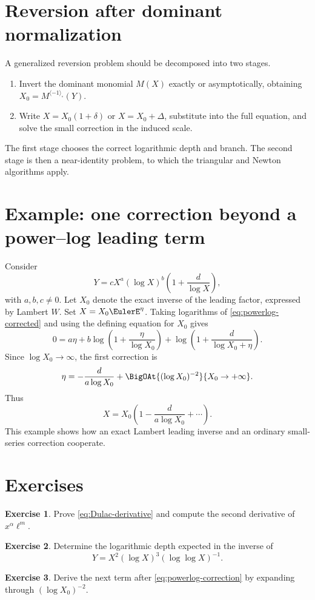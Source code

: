 \documentclass[11pt,openany]{book}
\theoremstyle{definition}
\newtheorem{exercise}{Exercise}[chapter]
\theoremstyle{plain}
\theoremstyle{remark}
\newcommand{\invcomp}{^{\langle -1\rangle_{\circ}}}
\begin{document}
\section{Reversion after dominant normalization}
A generalized reversion problem should be decomposed into two stages.
\begin{enumerate}
\item Invert the dominant monomial \(M(X)\) exactly or asymptotically, obtaining \(X_0=M\invcomp(Y)\).
\item Write \(X=X_0(1+\delta)\) or \(X=X_0+\Delta\), substitute into the full equation, and solve the small correction in the induced scale.
\end{enumerate}
The first stage chooses the correct logarithmic depth and branch. The second stage is then a near-identity problem, to which the triangular and Newton algorithms apply.

\section{Example: one correction beyond a power--log leading term}
Consider
\begin{equation}\label{eq:powerlog-corrected}
 Y=cX^a(\log X)^b\left(1+\frac{d}{\log X}\right),
\end{equation}
with \(a,b,c\ne0\). Let \(X_0\) denote the exact inverse of the leading factor, expressed by Lambert \(W\). Set \(X=X_0\EulerE^\eta\). Taking logarithms of \cref{eq:powerlog-corrected} and using the defining equation for \(X_0\) gives
\[
 0=a\eta+b\log\left(1+\frac{\eta}{\log X_0}\right)
 +\log\left(1+\frac{d}{\log X_0+\eta}\right).
\]
Since \(\log X_0\to\infty\), the first correction is
\begin{equation}\label{eq:powerlog-correction}
 \eta=-\frac{d}{a\log X_0}
 +\BigOAt{(\log X_0)^{-2}}{X_0\to+\infty}.
\end{equation}
Thus
\[
 X=X_0\left(1-\frac{d}{a\log X_0}+\cdots\right).
\]
This example shows how an exact Lambert leading inverse and an ordinary small-series correction cooperate.

\section{Exercises}
\begin{exercise}
Prove \cref{eq:Dulac-derivative} and compute the second derivative of \(x^\alpha\ell^m\).
\end{exercise}
\begin{exercise}
Determine the logarithmic depth expected in the inverse of
\[
 Y=X^2(\log X)^3(\log\log X)^{-1}.
\]
\end{exercise}
\begin{exercise}
Derive the next term after \cref{eq:powerlog-correction} by expanding through \((\log X_0)^{-2}\).
\end{exercise}
\end{document}
